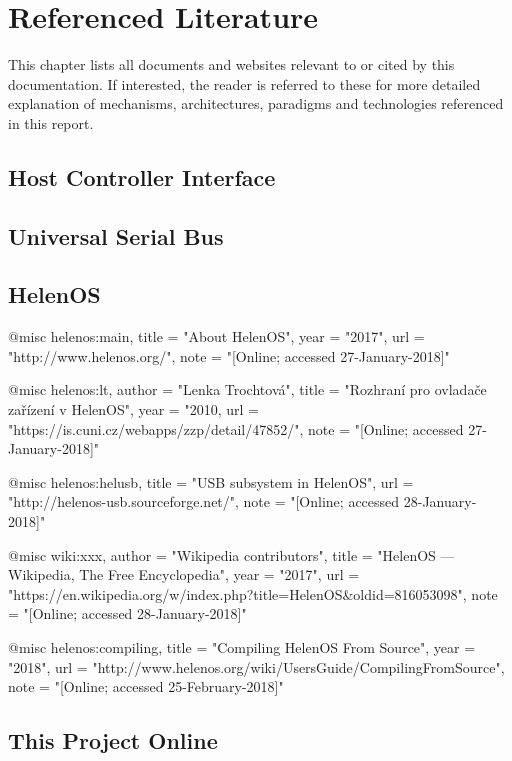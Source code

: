 \chapter{Referenced Literature}

This chapter lists all documents and websites relevant to or cited by this
documentation. If interested, the reader is referred to these for more detailed
explanation of mechanisms, architectures, paradigms and technologies referenced
in this report.


\section{Host Controller Interface}



\section{Universal Serial Bus}


\section{HelenOS}

@misc{ helenos:main,
    title = "About HelenOS",
    year = "2017",
    url = "http://www.helenos.org/",
    note = "[Online; accessed 27-January-2018]"
  }

@misc{ helenos:lt,
    author = "Lenka Trochtová",
    title = "Rozhraní pro ovladače zařízení v HelenOS",
    year = "2010,
    url = "https://is.cuni.cz/webapps/zzp/detail/47852/",
    note = "[Online; accessed 27-January-2018]"
  }

@misc{ helenos:helusb,
    title = "USB subsystem in HelenOS",
    url = "http://helenos-usb.sourceforge.net/",
    note = "[Online; accessed 28-January-2018]"
  }

@misc{ wiki:xxx,
    author = "Wikipedia contributors",
    title = "HelenOS --- Wikipedia{,} The Free Encyclopedia",
    year = "2017",
    url = "https://en.wikipedia.org/w/index.php?title=HelenOS\&oldid=816053098",
    note = "[Online; accessed 28-January-2018]"
  }

@misc{ helenos:compiling,
    title = "Compiling HelenOS From Source",
    year = "2018",
    url = "http://www.helenos.org/wiki/UsersGuide/CompilingFromSource",
    note = "[Online; accessed 25-February-2018]"
  }

\section{This Project Online}


